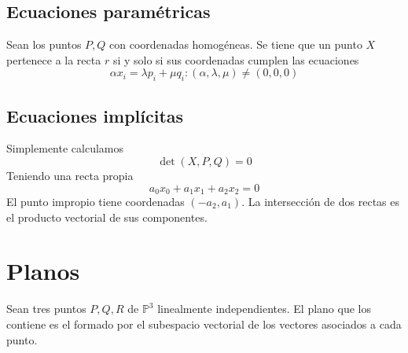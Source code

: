 \documentclass{Geometria.tex}
\begin{document}
\subsection{Ecuaciones paramétricas}
Sean los puntos $P,Q$ con coordenadas homogéneas. Se tiene que un punto $X$
pertenece a la recta $r$ si y solo si sus coordenadas cumplen las ecuaciones
\[
	\alpha x_{i} = \lambda p_{i} + \mu q_{i} : (\alpha, \lambda, \mu)
	\neq (0,0,0)
\]
\subsection{Ecuaciones implícitas}
Simplemente calculamos
\[
	\det (X, P, Q) = 0
\]
Teniendo una recta propia
\[
	a_{0}x_{0} + a_{1}x_{1} + a_{2}x_{2} = 0
\]
El punto impropio tiene coordenadas $(-a_{2}, a_{1})$. La intersección de dos rectas es el producto vectorial de sus componentes. 
\section{Planos}
Sean tres puntos $P,Q,R$ de $\mathbb{P} ^{3}$ linealmente independientes. El plano que los contiene es el formado por el subespacio vectorial de los vectores asociados a cada punto.  
\end{document}
